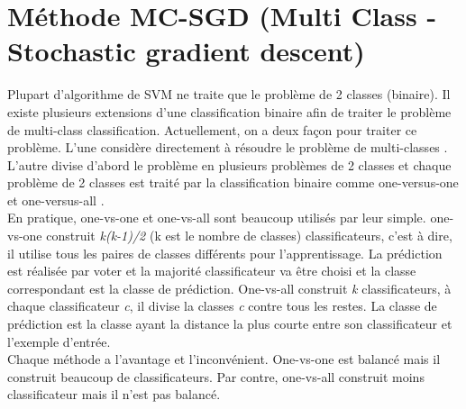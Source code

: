

\section{Méthode MC-SGD (Multi Class - Stochastic gradient descent)}
Plupart d'algorithme de SVM ne traite que le problème de 2 classes (binaire). Il existe plusieurs extensions d'une classification binaire afin de traiter le problème de multi-class classification. Actuellement, on a deux façon pour traiter ce problème. L'une considère directement à résoudre le problème de multi-classes \cite{ww99, yg07}. L'autre divise d'abord le problème en plusieurs problèmes de 2 classes et chaque problème de 2 classes est traité par la classification binaire comme one-versus-one \cite{vv95} et one-versus-all \cite{uk99}. \\

En pratique, one-vs-one et one-vs-all sont beaucoup utilisés par leur simple. one-vs-one construit \textit{k(k-1)/2} (k est le nombre de classes) classificateurs, c'est à dire, il utilise tous les paires de classes différents pour l'apprentissage. La prédiction est réalisée par voter et la majorité classificateur va être choisi et la classe correspondant est la classe de prédiction. One-vs-all construit \textit{k} classificateurs, à chaque classificateur \textit{c}, il divise la classes \textit{c} contre tous les restes. La classe de prédiction est la classe ayant la distance la plus courte entre son classificateur et l'exemple d'entrée. \\

Chaque méthode a l'avantage et l'inconvénient. One-vs-one est balancé mais il construit beaucoup de classificateurs. Par contre, one-vs-all construit moins classificateur mais il n'est pas balancé.